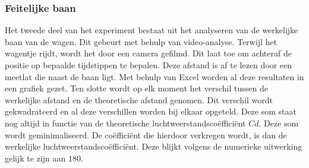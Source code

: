 \subsubsection{Feitelijke baan}
Het tweede deel van het experiment bestaat uit het analyseren van de werkelijke baan van de wagen. Dit gebeurt met behulp van video-analyse. Terwijl het wagentje rijdt, wordt het door een camera gefilmd. Dit laat toe om achteraf de positie op bepaalde tijdstippen te bepalen. Deze afstand is af te lezen door een meetlat die naast de baan ligt. Met behulp van Excel worden al deze resultaten in een grafiek gezet. Ten slotte wordt op elk moment het verschil tussen de werkelijke afstand en de theoretische afstand genomen. Dit verschil wordt gekwadrateerd en al deze verschillen worden bij elkaar opgeteld. Deze som staat nog altijd in functie van de theoretische luchtweerstandsco\"effici\"ent $Cd$. Deze som wordt geminimaliseerd. De co\"effici\"ent die hierdoor verkregen wordt, is dan de werkelijke luchtweerstandsco\"effici\"ent. Deze blijkt volgens de numerieke uitwerking gelijk te zijn aan $180$.


